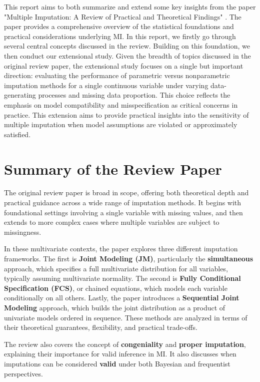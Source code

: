 \documentclass[12pt,oneside]{amsart}
\theoremstyle{definition}
\theoremstyle{remark}
\numberwithin{equation}{section}
\begin{document}
This report aims to both summarize and extend some key insights from the paper "Multiple Imputation: A Review of Practical and Theoretical Findings" \citep{qp}. The paper provides a comprehensive overview of the statistical foundations and practical considerations underlying MI. In this report, we firstly go through several central concepts discussed in the review. Building on this foundation, we then conduct our extensional study. Given the breadth of topics discussed in the original review paper, the extensional study focuses on a single but important direction: evaluating the performance of parametric versus nonparametric imputation methods for a single continuous variable under varying data-generating processes and missing data proportion. This choice reflects the emphasis on model compatibility and misspecification as critical concerns in practice. This extension aims to provide practical insights into the sensitivity of multiple imputation when model assumptions are violated or approximately satisfied.

\section{Summary of the Review Paper}
The original review paper is broad in scope, offering both theoretical depth and practical guidance across a wide range of imputation methods. It begins with foundational settings involving a single variable with missing values, and then extends to more complex cases where multiple variables are subject to missingness. 

In these multivariate contexts, the paper explores three different imputation frameworks. The first is \textbf{Joint Modeling (JM)}, particularly the \textbf{simultaneous} approach, which specifies a full multivariate distribution for all variables, typically assuming multivariate normality. The second is \textbf{Fully Conditional Specification (FCS)}, or chained equations, which models each variable conditionally on all others. Lastly, the paper introduces a \textbf{Sequential Joint Modeling} approach, which builds the joint distribution as a product of univariate models ordered in sequence. These methods are analyzed in terms of their theoretical guarantees, flexibility, and practical trade-offs. 

The review also covers the concept of \textbf{congeniality} and \textbf{proper imputation}, explaining their importance for valid inference in MI. It also discusses when imputations can be considered \textbf{valid} under both Bayesian and frequentist perspectives. 
\end{document}
